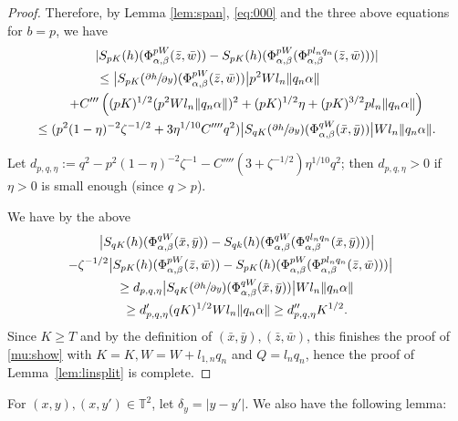 \documentclass[JEP,XML,SOM,Unicode,NoEqCountersInSection]{cedram}
\theoremstyle{definition}
\theoremstyle{plain}
\newcommand\TT{\mathbb{T}}
\begin{document}
\begin{proof}
Therefore, by Lemma \ref{lem:span}, \eqref{eq:000} and the three above equations for $b=p$, we have\vspace*{-2pt}
\begin{multline*}
|S_{pK}(h)(\Phi_{\alpha,\beta}^{pW}(\bar{z},\bar{w}))-
S_{pK}(h)(\Phi_{\alpha,\beta}^{pW}(\Phi_{\alpha,\beta}^{pl_nq_n}(\bar{z},\bar{w})))| \\
\hspace*{-1.5cm}\leq
\bigl|S_{pK}(\sfrac{\partial h}{\partial y})(\Phi_{\alpha,\beta}^{pW}(\bar{z},\bar{w}))\bigr|p^2Wl_n\|q_n\alpha\| \\
\shoveright{+
C'''\left( (pK)^{1/2}(p^2Wl_n\|q_n\alpha\|)^2 +(pK)^{1/2}\eta +
(pK)^{3/2}pl_n\|q_n\alpha\|\right)}
\\ \leq (p^2 (1-\eta)^{-2}\zeta^{-1/2} + 3\eta^{1/10}C'''' q^2)\bigl|S_{qK}(\sfrac{\partial h}{\partial y})
(\Phi_{\alpha,\beta}^{qW}(\bar{x},\bar{y}))\bigr|Wl_n\|q_n\alpha\|.
\end{multline*}

Let $d_{p,q,\eta}:= q^2- p^2 (1-\eta)^{-2}\zeta^{-1} - C'''' (3+ \zeta^{-1/2})\eta^{1/10} q^2 $; then $d_{p,q,\eta}>0$ if $\eta>0$ is small enough (since $q>p$).

We have by the above\vspace*{-2pt}
\begin{multline*}
\bigl|S_{qK}(h)(\Phi_{\alpha,\beta}^{qW}(\bar{x},\bar{y}))-
S_{qk}(h)(\Phi_{\alpha,\beta}^{qW}(\Phi_{\alpha,\beta}^{ql_nq_n}(\bar{x},\bar{y})))\bigr|\\
\shoveright{-\zeta^{-1/2}\bigl|S_{pK}(h)(\Phi_{\alpha,\beta}^{pW}(\bar{z},\bar{w}))-
S_{pK}(h)(\Phi_{\alpha,\beta}^{pW}(\Phi_{\alpha,\beta}^{pl_nq_n}(\bar{z},\bar{w})))\bigr|}\\
\geq
d_{p,q,\eta}\bigl|S_{qK}(\sfrac{\partial h}{\partial y})(\Phi_{\alpha,\beta}^{qW}(\bar{x},\bar{y}))\bigr|Wl_n\|q_n\alpha\|\\
\geq
d'_{p,q,\eta}(qK)^{1/2}Wl_n\|q_n\alpha\|\geq d''_{p,q,\eta}K^{1/2}.
\end{multline*}
Since $K\geq T$ and by the definition of $(\bar{x},\bar{y}),(\bar{z},\bar{w})$, this finishes the proof of \eqref{mu:show} with $K=K,W=W+l_{1,n}q_n$ and $Q=l_nq_n$,
hence the proof of Lemma~\ref{lem:linsplit} is complete.
\end{proof}

For $(x,y),(x,y')\in \TT^2$, let $\delta_y=\vert y-y'\vert$.
We also have the following lemma:
\end{document}
